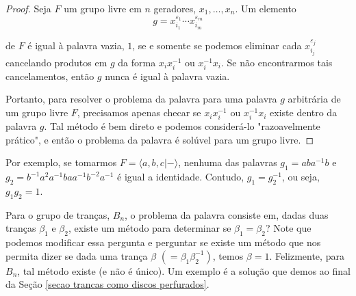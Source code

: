 \documentclass[a4paper,portuguese,11pt,twoside, leqno]{book}
\theoremstyle{definition}
\begin{document}
	\begin{proof}
		Seja $F$ um grupo livre em $n$ geradores, $x_1, \dots, x_n$. Um elemento 
		\begin{equation*}
		g = x_{i_1}^{\varepsilon_1}\cdots x_{i_m}^{\varepsilon_m}
		\end{equation*}
		\par\vspace{0.3cm} de $F$ é igual à palavra vazia, $1$, se e somente se podemos eliminar cada $x_{i_j}^{\varepsilon_j}$ cancelando produtos em $g$ da forma $x_ix_i^{-1}$ ou $x_i^{-1}x_i$. Se não encontrarmos tais cancelamentos, então $g$ nunca é igual à palavra vazia.
		\par\vspace{0.3cm} Portanto, para resolver o problema da palavra para uma palavra $g$ arbitrária de um grupo livre $F$, precisamos apenas checar se $x_ix_i^{-1}$ ou $x_i^{-1}x_i$ existe dentro da palavra $g$. Tal método é bem direto e podemos considerá-lo "razoavelmente prático", e então o problema da palavra é solúvel para um grupo livre. 
	\end{proof}
	\par\vspace{0.3cm} Por exemplo, se tomarmos $F = \langle a,b,c|- \rangle$, nenhuma das palavras $g_1 = aba^{-1}b$ e $g_2 = b^{-1}a^2a^{-1}baa^{-1}b^{-2}a^{-1}$ é igual a identidade. Contudo, $g_1 = g_2^{-1}$, ou seja, $g_1g_2 = 1$.
	\par\vspace{0.3cm} Para o grupo de tranças, $B_n$, o problema da palavra consiste em, dadas duas tranças $\beta_1$ e $\beta_2$, existe um método para determinar se $\beta_1 = \beta_2$? Note que podemos modificar essa pergunta e perguntar se existe um método que nos permita dizer se dada uma trança $\beta$ $(=\beta_1\beta_2^{-1})$, temos $\beta = 1$. Felizmente, para $B_n$, tal método existe (e não é único). Um exemplo é a solução que demos ao final da Seção \eqref{secao trancas como discos perfurados}.
	
	
	
\end{document}
